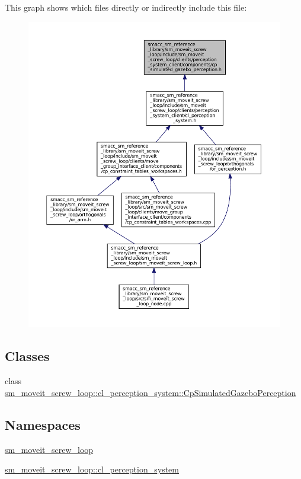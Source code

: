 This graph shows which files directly or indirectly include this file\+:
\nopagebreak
\begin{figure}[H]
\begin{center}
\leavevmode
\includegraphics[width=350pt]{sm__moveit__screw__loop_2include_2sm__moveit__screw__loop_2clients_2perception__system__client_248812f6f3854815dfdcb4daef37d4c3c}
\end{center}
\end{figure}
\subsection*{Classes}
\begin{DoxyCompactItemize}
\item 
class \hyperlink{classsm__moveit__screw__loop_1_1cl__perception__system_1_1CpSimulatedGazeboPerception}{sm\+\_\+moveit\+\_\+screw\+\_\+loop\+::cl\+\_\+perception\+\_\+system\+::\+Cp\+Simulated\+Gazebo\+Perception}
\end{DoxyCompactItemize}
\subsection*{Namespaces}
\begin{DoxyCompactItemize}
\item 
 \hyperlink{namespacesm__moveit__screw__loop}{sm\+\_\+moveit\+\_\+screw\+\_\+loop}
\item 
 \hyperlink{namespacesm__moveit__screw__loop_1_1cl__perception__system}{sm\+\_\+moveit\+\_\+screw\+\_\+loop\+::cl\+\_\+perception\+\_\+system}
\end{DoxyCompactItemize}
